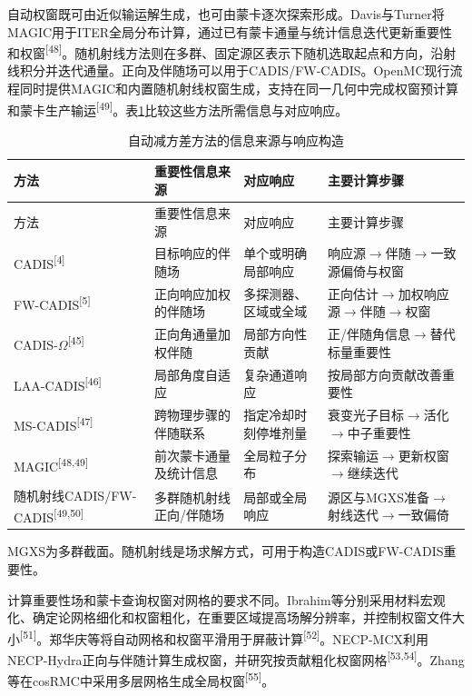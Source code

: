 \documentclass[UTF8, zihao=-4, fontset=none, a4paper]{ctexart}
\newcommand{\upcite}[1]{\textsuperscript{[#1]}}
\begin{document}
自动权窗既可由近似输运解生成，也可由蒙卡逐次探索形成。Davis与Turner将MAGIC用于ITER全局分布计算，通过已有蒙卡通量与统计信息迭代更新重要性和权窗\upcite{48}。随机射线方法则在多群、固定源区表示下随机选取起点和方向，沿射线积分并迭代通量。正向及伴随场可以用于CADIS/FW-CADIS。OpenMC现行流程同时提供MAGIC和内置随机射线权窗生成，支持在同一几何中完成权窗预计算和蒙卡生产输运\upcite{49}。表\ref{tab:3}比较这些方法所需信息与对应响应。 \par
\Needspace{0.70\textheight}
\begin{longtable}{@{}>{\raggedright\arraybackslash}p{}>{\raggedright\arraybackslash}p{}>{\raggedright\arraybackslash}p{}>{\raggedright\arraybackslash}p{}@{}}
\caption{自动减方差方法的信息来源与响应构造}\label{tab:3}\\
\toprule
方法 & 重要性信息来源 & 对应响应 & 主要计算步骤 \\
\midrule
\endfirsthead
\toprule
方法 & 重要性信息来源 & 对应响应 & 主要计算步骤 \\
\midrule
\endhead
\bottomrule
\endlastfoot
CADIS\upcite{4} & 目标响应的伴随场 & 单个或明确局部响应 & 响应源$\rightarrow$伴随$\rightarrow$一致源偏倚与权窗 \\
FW-CADIS\upcite{5} & 正向响应加权的伴随场 & 多探测器、区域或全域 & 正向估计$\rightarrow$加权响应源$\rightarrow$伴随$\rightarrow$权窗 \\
CADIS-$\Omega$\upcite{45} & 正向角通量加权伴随 & 局部方向性贡献 & 正/伴随角信息$\rightarrow$替代标量重要性 \\
LAA-CADIS\upcite{46} & 局部角度自适应 & 复杂通道响应 & 按局部方向贡献改善重要性 \\
MS-CADIS\upcite{47} & 跨物理步骤的伴随联系 & 指定冷却时刻停堆剂量 & 衰变光子目标$\rightarrow$活化$\rightarrow$中子重要性 \\
MAGIC\upcite{48,49} & 前次蒙卡通量及统计信息 & 全局粒子分布 & 探索输运$\rightarrow$更新权窗$\rightarrow$继续迭代 \\
随机射线CADIS/FW-CADIS\upcite{49,50} & 多群随机射线正向/伴随场 & 局部或全局响应 & 源区与MGXS准备$\rightarrow$射线迭代$\rightarrow$一致偏倚 \\
\end{longtable}

MGXS为多群截面。随机射线是场求解方式，可用于构造CADIS或FW-CADIS重要性。

计算重要性场和蒙卡查询权窗对网格的要求不同。Ibrahim等分别采用材料宏观化、确定论网格细化和权窗粗化，在重要区域提高场解分辨率，并控制权窗文件大小\upcite{51}。郑华庆等将自动网格和权窗平滑用于屏蔽计算\upcite{52}。NECP-MCX利用NECP-Hydra正向与伴随计算生成权窗，并研究按贡献粗化权窗网格\upcite{53,54}。Zhang等在cosRMC中采用多层网格生成全局权窗\upcite{55}。
\end{document}
